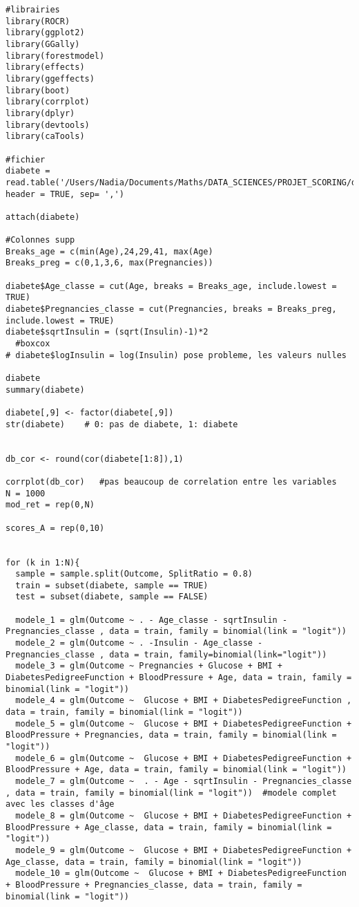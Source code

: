 \documentclass[11pt, oneside]{article}   	%
\begin{document}
\begin{lstlisting}[langage = R]
#librairies
library(ROCR)
library(ggplot2)
library(GGally)
library(forestmodel)
library(effects)
library(ggeffects)
library(boot)
library(corrplot)
library(dplyr)
library(devtools)
library(caTools)  

#fichier
diabete = read.table('/Users/Nadia/Documents/Maths/DATA_SCIENCES/PROJET_SCORING/diabetes.csv', header = TRUE, sep= ',')

attach(diabete)

#Colonnes supp
Breaks_age = c(min(Age),24,29,41, max(Age)
Breaks_preg = c(0,1,3,6, max(Pregnancies))

diabete$Age_classe = cut(Age, breaks = Breaks_age, include.lowest = TRUE)
diabete$Pregnancies_classe = cut(Pregnancies, breaks = Breaks_preg, include.lowest = TRUE)
diabete$sqrtInsulin = (sqrt(Insulin)-1)*2
  #boxcox
# diabete$logInsulin = log(Insulin) pose probleme, les valeurs nulles

diabete
summary(diabete)

diabete[,9] <- factor(diabete[,9])
str(diabete)    # 0: pas de diabete, 1: diabete 


db_cor <- round(cor(diabete[1:8]),1)

corrplot(db_cor)   #pas beaucoup de correlation entre les variables 
N = 1000
mod_ret = rep(0,N)

scores_A = rep(0,10)


for (k in 1:N){
  sample = sample.split(Outcome, SplitRatio = 0.8)
  train = subset(diabete, sample == TRUE)
  test = subset(diabete, sample == FALSE) 
  
  modele_1 = glm(Outcome ~ . - Age_classe - sqrtInsulin - Pregnancies_classe , data = train, family = binomial(link = "logit"))   
  modele_2 = glm(Outcome ~ . -Insulin - Age_classe - Pregnancies_classe , data = train, family=binomial(link="logit")) 
  modele_3 = glm(Outcome ~ Pregnancies + Glucose + BMI + DiabetesPedigreeFunction + BloodPressure + Age, data = train, family = binomial(link = "logit"))
  modele_4 = glm(Outcome ~  Glucose + BMI + DiabetesPedigreeFunction , data = train, family = binomial(link = "logit"))
  modele_5 = glm(Outcome ~  Glucose + BMI + DiabetesPedigreeFunction + BloodPressure + Pregnancies, data = train, family = binomial(link = "logit")) 
  modele_6 = glm(Outcome ~  Glucose + BMI + DiabetesPedigreeFunction + BloodPressure + Age, data = train, family = binomial(link = "logit")) 
  modele_7 = glm(Outcome ~  . - Age - sqrtInsulin - Pregnancies_classe , data = train, family = binomial(link = "logit"))  #modele complet avec les classes d'âge
  modele_8 = glm(Outcome ~  Glucose + BMI + DiabetesPedigreeFunction + BloodPressure + Age_classe, data = train, family = binomial(link = "logit")) 
  modele_9 = glm(Outcome ~  Glucose + BMI + DiabetesPedigreeFunction + Age_classe, data = train, family = binomial(link = "logit")) 
  modele_10 = glm(Outcome ~  Glucose + BMI + DiabetesPedigreeFunction + BloodPressure + Pregnancies_classe, data = train, family = binomial(link = "logit"))  
  

\end{lstlisting}
\end{document}
